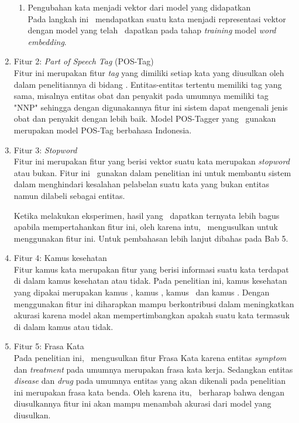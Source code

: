 \begin{enumerate}
\begin{enumerate}
		\item Pengubahan kata menjadi vektor dari model yang didapatkan\\
		Pada langkah ini \saya~mendapatkan suatu kata menjadi representasi vektor dengan model yang telah \saya~dapatkan pada tahap \textit{training} model \textit{word embedding}.
	\end{enumerate}
	
	\item Fitur 2: \textit{Part of Speech Tag} (POS-Tag)\\
	Fitur ini merupakan fitur \textit{tag} yang dimiliki setiap kata yang diusulkan oleh \cite{abacha2011medical} dalam penelitiannya di bidang \mer. Entitas-entitas tertentu memiliki tag yang sama, misalnya entitas obat dan penyakit pada umumnya memiliki tag "NNP" sehingga dengan digunakannya fitur ini sistem dapat mengenali jenis obat dan penyakit dengan lebih baik. Model POS-Tagger yang \saya~gunakan merupakan model POS-Tag berbahasa Indonesia.
	
	\item Fitur 3: \textit{Stopword}\\
	Fitur ini merupakan fitur yang berisi vektor suatu kata merupakan \textit{stopword} atau bukan. Fitur ini \saya~gunakan dalam penelitian ini untuk membantu sistem dalam menghindari kesalahan pelabelan suatu kata yang bukan entitas namun dilabeli sebagai entitas.
	
	Ketika melakukan eksperimen, hasil yang \saya~dapatkan ternyata lebih bagus apabila mempertahankan fitur ini, oleh karena intu, \saya~mengusulkan untuk menggunakan fitur ini. Untuk pembahasan lebih lanjut dibahas pada Bab 5.
	
	\item Fitur 4: Kamus kesehatan\\
	Fitur kamus kata merupakan fitur yang berisi informasi suatu kata terdapat di dalam kamus kesehatan atau tidak. Pada penelitian ini, kamus kesehatan yang dipakai merupakan kamus \disease, kamus \symptom, kamus \drug~dan kamus \treatment. Dengan menggunakan fitur ini diharapkan mampu berkontribusi dalam meningkatkan akurasi karena model akan mempertimbangkan apakah suatu kata termasuk di dalam kamus atau tidak. 
	
	\item Fitur 5: Frasa Kata\\
	Pada penelitian ini, \saya~mengusulkan fitur Frasa Kata karena entitas \textit{symptom} dan \textit{treatment}  pada umumnya merupakan frasa kata kerja. Sedangkan entitas \textit{disease} dan \textit{drug} pada umumnya entitas yang akan dikenali pada penelitian ini merupakan frasa kata benda. Oleh karena itu, \saya~berharap bahwa dengan diusulkannya fitur ini akan mampu menambah akurasi dari model yang diusulkan.
	

\end{enumerate}

